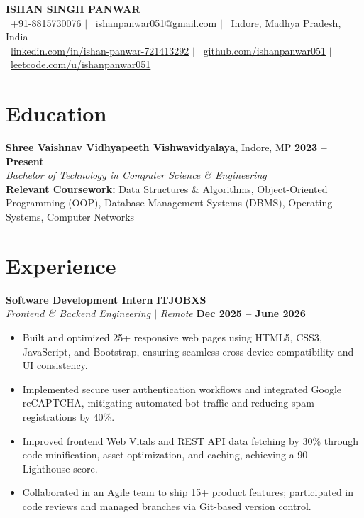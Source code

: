 \documentclass[a4paper,10pt]{article}
\begin{document}
\begin{center}
    {\Huge \textbf{ISHAN SINGH PANWAR}} \\[3pt]
    \small
    \faPhone* \ +91-8815730076 \quad $|$ \quad
    \faEnvelope \ \href{mailto:ishanpanwar051@gmail.com}{ishanpanwar051@gmail.com} \quad $|$ \quad
    \faMapMarker* \ Indore, Madhya Pradesh, India \\[3pt]
    \faLinkedin \ \href{https://www.linkedin.com/in/ishan-panwar-721413292}{linkedin.com/in/ishan-panwar-721413292} \quad $|$ \quad
    \faGithub \ \href{https://github.com/ishanpanwar051}{github.com/ishanpanwar051} \quad $|$ \quad
    \faCode \ \href{https://leetcode.com/u/ishanpanwar051}{leetcode.com/u/ishanpanwar051}
\end{center}

\vspace{-6pt}

\section{Education}
\noindent
\textbf{Shree Vaishnav Vidhyapeeth Vishwavidyalaya}, Indore, MP \hfill \textbf{2023 -- Present} \\
\textit{Bachelor of Technology in Computer Science \& Engineering} \\
\small \textbf{Relevant Coursework:} Data Structures \& Algorithms, Object-Oriented Programming (OOP), Database Management Systems (DBMS), Operating Systems, Computer Networks

\vspace{-3pt}

\section{Experience}
\noindent
\textbf{Software Development Intern} \hfill \textbf{ITJOBXS} \\
\textit{Frontend \& Backend Engineering $|$ Remote} \hfill \textbf{Dec 2025 -- June 2026}
\begin{itemize}[leftmargin=*, itemsep=1.5pt, parsep=0pt, topsep=1.5pt, partopsep=0pt]
    \item Built and optimized 25+ responsive web pages using HTML5, CSS3, JavaScript, and Bootstrap, ensuring seamless cross-device compatibility and UI consistency.
    \item Implemented secure user authentication workflows and integrated Google reCAPTCHA, mitigating automated bot traffic and reducing spam registrations by 40\%.
    \item Improved frontend Web Vitals and REST API data fetching by 30\% through code minification, asset optimization, and caching, achieving a 90+ Lighthouse score.
    \item Collaborated in an Agile team to ship 15+ product features; participated in code reviews and managed branches via Git-based version control.
\end{itemize}
\end{document}
